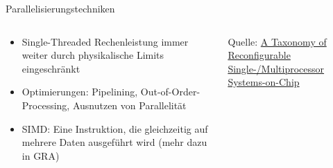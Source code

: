 \documentclass[
  german,            %
  aspectratio=169,    %
]{tumbeamer}
\begin{document}
\begin{frame}[c, fragile]{Parallelisierungstechniken}{}
	\begin{columns}[c]
		\begin{column}{0.5\textwidth}
			\begin{itemize}
				\item Single-Threaded Rechenleistung immer weiter durch physikalische Limits eingeschränkt
				\item Optimierungen: Pipelining, Out-of-Order-Processing, Ausnutzen von Parallelität
				\item SIMD: Eine Instruktion, die gleichzeitig auf mehrere Daten ausgeführt wird (mehr dazu in GRA)

			\end{itemize}
		\end{column}
		\begin{column}{0.5\textwidth}
			\begin{center}
			\end{center}
			\centering
			\tiny{Quelle: \href{https://www.researchgate.net/publication/26639095_A_Taxonomy_of_Reconfigurable_Single-Multiprocessor_Systems-on-Chip}{A Taxonomy of Reconfigurable Single-/Multiprocessor\\Systems-on-Chip}}
		\end{column}
	\end{columns}
\end{frame}
\end{document}
